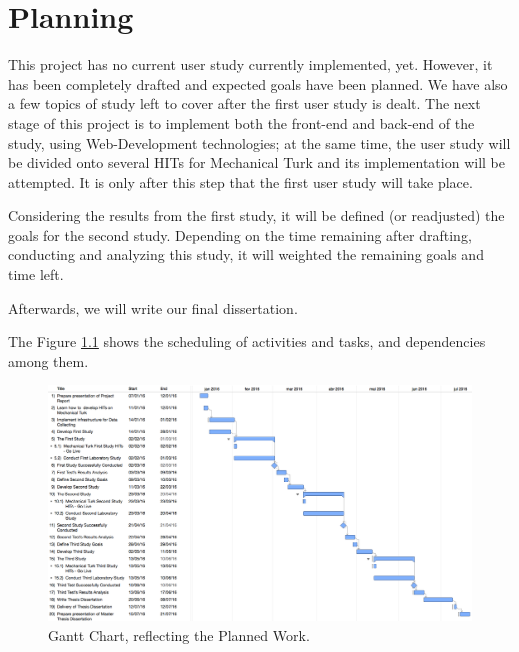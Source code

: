 \documentclass{report}
\begin{document}
\chapter{Planning}
This project has no current user study currently implemented, yet. However, it has been completely drafted and expected goals have been planned.
We have also a few topics of study left to cover after the first user study is dealt. The next stage of this project is to implement both the front-end
and back-end of the study, using Web-Development technologies; at the same time, the user study will be divided onto several HITs for Mechanical Turk
and its implementation will be attempted. It is only after this step that the first user study will take place. \par
Considering the results from the first study, it will be defined (or readjusted) the goals for the second study. Depending on the time remaining after
drafting, conducting and analyzing this study, it will weighted the remaining goals and time left. \par
Afterwards, we will write our final dissertation. \par
The Figure \ref{fig:augmented} shows the scheduling of activities and tasks, and dependencies among them.
%
\begin{figure}[h!]
	\centering
    \includegraphics[width=1\textwidth]{Gantt.png}
    \caption[Gantt Chart of Planning]{Gantt Chart, reflecting the Planned Work.}
    \label{fig:augmented}
\end{figure}
%
\end{document}
